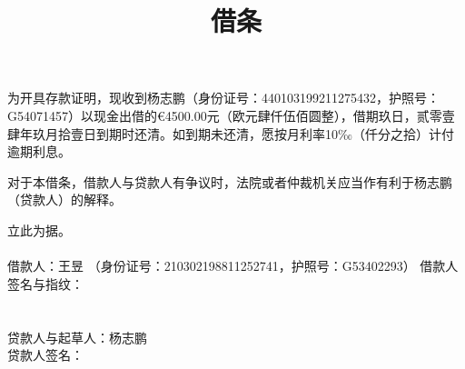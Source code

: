 \documentclass[UTF8]{ctexart}
\title{借条}
\date{}
\begin{document}
\maketitle
\thispagestyle{empty}

为开具存款证明，现收到杨志鹏（身份证号：440103199211275432，护照号：G54071457）以现金出借的€4500.00元（欧元肆仟伍佰圆整），借期玖日，贰零壹肆年玖月拾壹日到期时还清。如到期未还清，愿按月利率10‰（仟分之拾）计付逾期利息。

对于本借条，借款人与贷款人有争议时，法院或者仲裁机关应当作有利于杨志鹏（贷款人）的解释。

立此为据。
\\\\借款人：王昱
（身份证号：210302198811252741，护照号：G53402293）
借款人签名与指纹：
\\\\\\贷款人与起草人：杨志鹏
\\贷款人签名：
\\\\
\end{document}
